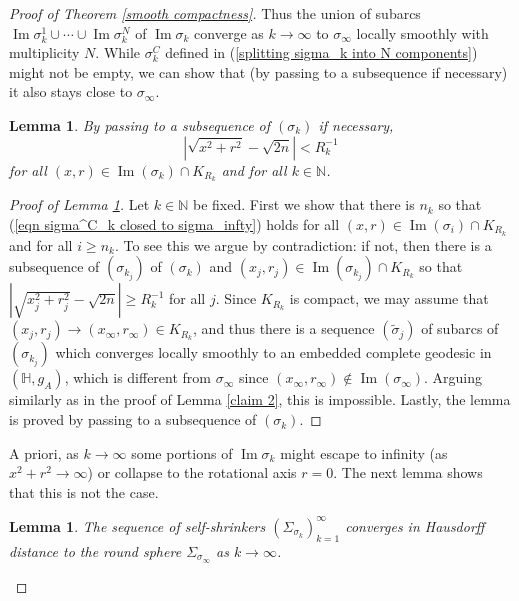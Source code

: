 \documentclass[12pt]{amsart}
\numberwithin{equation}{section}
\newtheorem{lem}[thm]{Lemma}
\theoremstyle{remark}
\begin{document}
\begin{proof} [Proof of Theorem \ref{smooth compactness}]
		Thus the union of subarcs $\operatorname{Im} \sigma_k^1 \cup \cdots  \cup \operatorname{Im} \sigma_k^N$ of $\operatorname{Im}\sigma_k$ converge as $k\to \infty$ to $\sigma_\infty$ locally smoothly with multiplicity $N$. While $\sigma^C_k$ defined in (\ref{splitting sigma_k into N components}) might not be empty, we can show that (by passing to a subsequence if necessary) it also stays close to $\sigma_\infty$.
		
		\begin{lem} \label{sigma^c_k stays close to sigma_infty}
			By passing to a subsequence of $(\sigma_k)$ if necessary,  
			\begin{equation} \label{eqn sigma^C_k closed to sigma_infty}
				|\sqrt{x^2+r^2} - \sqrt{2n}|<R_k^{-1}
			\end{equation}
			for all $(x, r)\in \operatorname{Im} (\sigma_k) \cap K_{R_k}$ and for all $k\in \mathbb N$.
		\end{lem}
		
		\begin{proof}[Proof of Lemma \ref{sigma^c_k stays close to sigma_infty}]
			Let $k\in \mathbb N$ be fixed. First we show that there is $n_k$ so that (\ref{eqn sigma^C_k closed to sigma_infty}) holds for all $(x, r)\in \operatorname{Im} (\sigma_i) \cap K_{R_k}$ and for all $i\ge n_k$. To see this we argue by contradiction: if not, then there is a subsequence of $(\sigma_{k_j})$ of $(\sigma_k)$ and $(x_j, r_j)\in \operatorname{Im} (\sigma_{k_j})\cap K_{R_k}$ so that $|\sqrt{x_j^2+r_j^2} - \sqrt{2n}|\ge R_k^{-1}$ for all $j$. Since $K_{R_k}$ is compact, we may assume that $(x_j, r_j)\to (x_\infty, r_\infty) \in K_{R_k}$, and thus there is a sequence $(\tilde\sigma_j)$ of subarcs of $(\sigma_{k_j})$ which converges locally smoothly to an embedded complete geodesic in $(\mathbb H, g_A)$, which is different from $\sigma_\infty$ since $(x_\infty, r_\infty) \notin \operatorname{Im}(\sigma_\infty)$. Arguing similarly as in the proof of Lemma \ref{claim 2}, this is impossible. Lastly, the lemma is proved by passing to a subsequence of $(\sigma_k)$.
		\end{proof}
		
		A priori, as $k\to \infty$ some portions of $\operatorname{Im} \sigma_k$ might escape to infinity (as $x^2 + r^2\to \infty$) or collapse to the rotational axis $r=  0$. The next lemma shows that this is not the case. 
		
		\begin{lem} \label{claim 3} 
			The sequence of self-shrinkers $(\Sigma_{\sigma_k})_{k=1}^\infty$ converges in Hausdorff distance to the round sphere $\Sigma_{\sigma_\infty}$ as $k\to \infty$. 
		\end{lem}
		

\end{proof}
\end{document}
